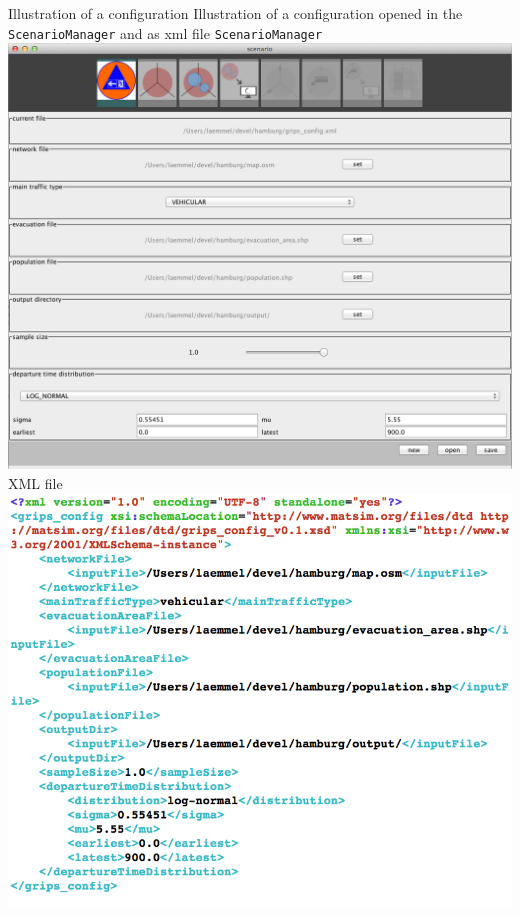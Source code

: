 \createfigure%
{Illustration of a configuration}%
{Illustration of a configuration opened in the \lstinline|ScenarioManager| and as \protect\gls{xml} file}%
{\label{chap:evac:fig:sc_man}}%
{%
  \createsubfigure%
  {\lstinline|ScenarioManager|}%
{\includegraphics[width=.475\linewidth]{extending/figures/Evacuation/grips_config}}
  {}%
  {}%
  \createsubfigure%
  {XML file}%
{\includegraphics[width=.475\linewidth]{extending/figures/Evacuation/grips_config_xml}}
  {}%
  {}%
}%
  {}%


